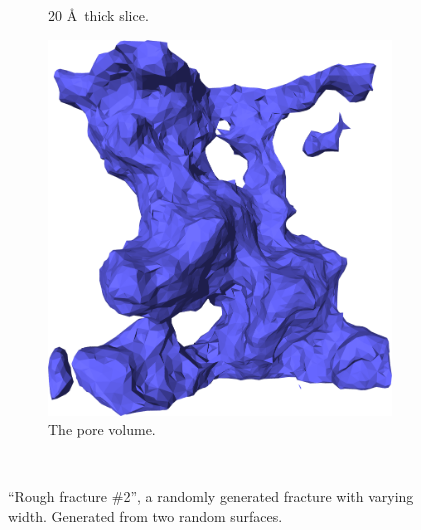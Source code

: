 \begin{figure}[!p]
{\begin{subfigure}[t]{\myfigwidth}
            \caption{20 \AA\ thick slice.}%
        \end{subfigure}%
        \hspace{\myhfillwidth}%
        \begin{subfigure}[t]{\myfigwidth}%
            \centering%
            \includegraphics[width=\textwidth]{images/systems/trimmed-rough_fracture03_11}%
            \caption{The pore volume.}%
        \end{subfigure}%
    }%
    \vspace{10pt}\\%
    \caption{%
        ``Rough fracture \#2'', a randomly generated fracture with varying width. Generated from two random surfaces.%
        \label{fig:renderings_rough_fracture03}%
    }%
\end{figure}%


